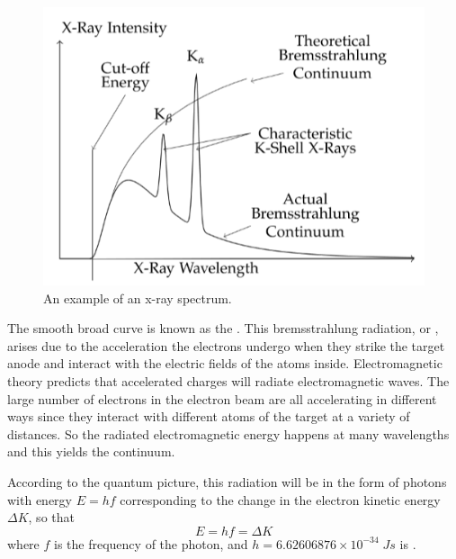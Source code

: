 \documentclass[12pt, a4paper, oneside, openright, titlepage]{book}
\begin{document}
\begin{figure}[H]
    \centering
    \includegraphics[scale = 0.8]{Images/XR4.PNG}
    \caption{An example of an x-ray spectrum.}
    \label{fig:XR4}
\end{figure}

\noindent The smooth broad curve is known as the . This bremsstrahlung radiation, or , arises due to the acceleration the electrons undergo when they strike the target anode and interact with the electric fields of the atoms inside. Electromagnetic theory predicts that accelerated charges will radiate electromagnetic waves. The large number of electrons in the electron beam are all accelerating in different ways since they interact with different atoms of the target at a variety of distances. So the radiated electromagnetic energy happens at many wavelengths and this yields the continuum.

\noindent According to the quantum picture, this radiation will be in the form of photons with energy $E = hf$ corresponding to the change in the electron kinetic energy $\Delta K$, so that \begin{equation}\label{eq:XR1}
    E = hf = \Delta K
\end{equation}
where $f$ is the frequency of the photon, and $h = 6.62606876\times 10^{-34}\;Js$ is .
\end{document}
